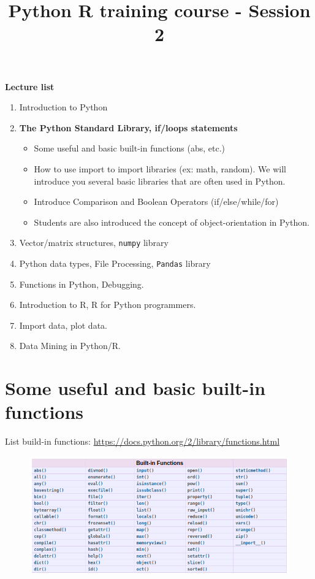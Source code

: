 \documentclass[11pt]{article}
\title{Python R training course - Session 2}
\makeatletter
\def\maxwidth{\ifdim\Gin@nat@width>\linewidth\linewidth
    \else\Gin@nat@width\fi}
\let\Oldincludegraphics\includegraphics
\renewcommand{\includegraphics}[1]{\Oldincludegraphics[width=.8\maxwidth]{#1}}
\providecommand{\tightlist}{%
      \setlength{\itemsep}{0pt}\setlength{\parskip}{0pt}}
\makeatother
\begin{document}
    
    
    \maketitle
    
    

    
    \textbf{Lecture list}

\begin{enumerate}
\def\labelenumi{\arabic{enumi}.}
\item
  Introduction to Python
\item
  \textbf{The Python Standard Library, if/loops statements}

  \begin{itemize}
  \tightlist
  \item
    Some useful and basic built-in functions (abs, etc.)
  \item
    How to use import to import libraries (ex: math, random). We will
    introduce you several basic libraries that are often used in Python.
  \item
    Introduce Comparison and Boolean Operators (if/else/while/for)
  \item
    Students are also introduced the concept of object-orientation in
    Python.
  \end{itemize}
\item
  Vector/matrix structures, \texttt{numpy} library
\item
  Python data types, File Processing, \texttt{Pandas} library
\item
  Functions in Python, Debugging.
\item
  Introduction to R, R for Python programmers.
\item
  Import data, plot data.
\item
  Data Mining in Python/R.
\end{enumerate}

    \section{Some useful and basic built-in
functions}\label{some-useful-and-basic-built-in-functions}

List build-in functions:
\url{https://docs.python.org/2/library/functions.html}

\begin{figure}
\centering
\includegraphics{figs/session_2/buildin-function.png}
\caption{}
\end{figure}
\end{document}
